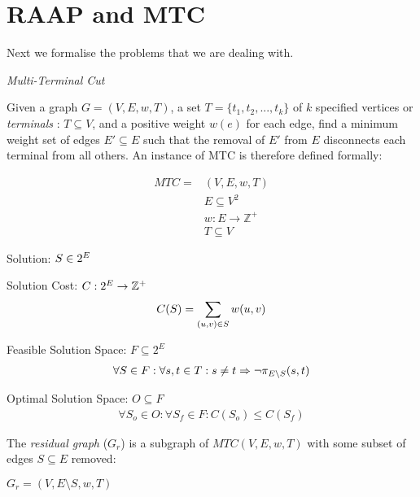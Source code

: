 \section{RAAP and MTC}

Next we formalise the problems that we are dealing with.

\begin{definition}
{\em Multi-Terminal Cut}

Given a graph $G=(V,E,w,T)$, a set $T=\{t_1, t_2, ..., t_k\}$ of $k$ specified vertices or {\em terminals} : $T \subseteq V$, and a positive weight $w(e)$ for each edge, find a minimum weight set of edges $E' \subseteq E$ such that the removal of $E'$ from $E$ disconnects each terminal from all others.
An instance of MTC is therefore defined formally:

\begin{align}
	\nonumber MTC = & (V,E,w,T)\\
	\nonumber & E \subseteq V^2\\
	\nonumber & w : E \rightarrow \mathbb{Z}^+\\
	\nonumber & T \subseteq V
\end{align}

Solution: $S \in 2^E$

Solution Cost: $C : 2^E \rightarrow \mathbb{Z}^+$
\begin{align}
	\nonumber C(S) = \displaystyle\sum\limits_{(u,v) \in S} w(u,v)
\end{align}

Feasible Solution Space: $F \subseteq 2^E$
\begin{align}
	\nonumber \forall S \in F : \forall s, t \in T: s \neq t \Rightarrow \neg\pi_{E \setminus S}(s, t)
\end{align}

Optimal Solution Space: $O \subseteq F$
\begin{align}
	\forall S_o \in O : \forall S_f \in F : \nonumber C(S_o) \leq C(S_f)
\end{align}

\end{definition}

\begin{definition}
The {\em residual graph} ($G_r$) is a subgraph of $MTC(V,E,w,T)$ with some subset of edges $S \subseteq E$ removed:

$G_r = (V, E \setminus S, w, T)$
\end{definition}

